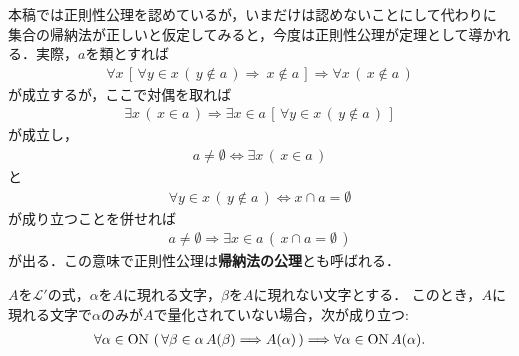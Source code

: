 	本稿では正則性公理を認めているが，いまだけは認めないことにして代わりに
	集合の帰納法が正しいと仮定してみると，今度は正則性公理が定理として導かれる．実際，$a$を類とすれば
	\begin{align}
		\forall x\, \left[\, \forall y \in x\, (\, y \notin a\, )
		\Longrightarrow\ x \notin a\, \right]
		\Longrightarrow \forall x\, (\, x \notin a\, )
	\end{align}
	が成立するが，ここで対偶を取れば
	\begin{align}
		\exists x\, (\, x \in a\, ) \Longrightarrow 
		\exists x \in a\, \left[\, \forall y \in x\, (\, y \notin a\, )\, \right]
	\end{align}
	が成立し，
	\begin{align}
		a \neq \emptyset \Longleftrightarrow \exists x\, (\, x \in a\, )
	\end{align}
	と
	\begin{align}
		\forall y \in x\, (\, y \notin a\, ) \Longleftrightarrow x \cap a = \emptyset 
	\end{align}
	が成り立つことを併せれば
	\begin{align}
		a \neq \emptyset \Longrightarrow 
		\exists x \in a\, (\, x \cap a = \emptyset\, )
	\end{align}
	が出る．この意味で正則性公理は{\bf 帰納法の公理}とも呼ばれる．
	
	\begin{screen}
		\begin{thm}[超限帰納法]\label{thm:transfinite_induction}
			$A$を$\mathcal{L}'$の式，$\alpha$を$A$に現れる文字，$\beta$を$A$に現れない文字とする．
			このとき，$A$に現れる文字で$\alpha$のみが$A$で量化されていない場合，次が成り立つ:
			\begin{align}
				\forall \alpha \in \mathrm{ON}\, \left(\, \forall \beta \in \alpha\, A(\beta) \Longrightarrow A(\alpha)\, \right)
				\Longrightarrow \forall \alpha \in \mathrm{ON}\, A(\alpha).
			\end{align}
		\end{thm}
	\end{screen}
	
